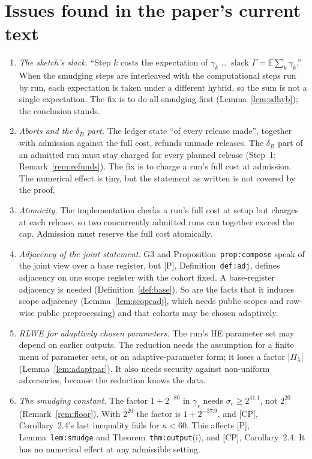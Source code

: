 \documentclass[11pt]{article}
\theoremstyle{definition}
\theoremstyle{plain}
\newcommand{\Ex}{\mathbb{E}}
\newcommand{\CP}{\textup{[CP]}}
\newcommand{\Pp}{\textup{[P]}}
\begin{document}
\section{Issues found in the paper's current text}
\label{sec:issues}

\begin{enumerate}[label=(I\arabic*)]
  \item \emph{The sketch's slack.} ``Step $k$ costs the expectation of $\gamma_k$ \dots\ slack $\Gamma=\Ex\sum_k\gamma_k$.'' When the smudging steps are interleaved with the computational steps run by run, each expectation is taken under a different hybrid, so the sum is not a single expectation. The fix is to do all smudging first (Lemma~\ref{lem:sdhyb}); the conclusion stands.
  \item \emph{Aborts and the $\delta_B$ part.} The ledger state ``of every release made'', together with admission against the full cost, refunds unmade releases. The $\delta_B$ part of an admitted run must stay charged for every planned release (Step~1; Remark~\ref{rem:refunds}). The fix is to charge a run's full cost at admission. The numerical effect is tiny, but the statement as written is not covered by the proof.
  \item \emph{Atomicity.} The implementation checks a run's full cost at setup but charges at each release, so two concurrently admitted runs can together exceed the cap. Admission must reserve the full cost atomically.
  \item \emph{Adjacency of the joint statement.} G3 and Proposition~\texttt{prop:compose} speak of the joint view over a base register, but \Pp, Definition~\texttt{def:adj}, defines adjacency on one scope register with the cohort fixed. A base-register adjacency is needed (Definition~\ref{def:base}). So are the facts that it induces scope adjacency (Lemma~\ref{lem:scopeadj}, which needs public scopes and row-wise public preprocessing) and that cohorts may be chosen adaptively.
  \item \emph{RLWE for adaptively chosen parameters.} The run's HE parameter set may depend on earlier outputs. The reduction needs the assumption for a finite menu of parameter sets, or an adaptive-parameter form; it loses a factor $|\Pi_\lambda|$ (Lemma~\ref{lem:adaptpar}). It also needs security against non-uniform adversaries, because the reduction knows the data.
  \item \emph{The smudging constant.} The factor $1+2^{-80}$ in $\gamma_s$ needs $\sigma_c\ge2^{41.1}$, not $2^{20}$ (Remark~\ref{rem:floor}). With $2^{20}$ the factor is $1+2^{-37.9}$, and \CP, Corollary~2.4's last inequality fails for $\kappa<60$. This affects \Pp, Lemma~\texttt{lem:smudge} and Theorem~\texttt{thm:output}(i), and \CP, Corollary~2.4. It has no numerical effect at any admissible setting.

\end{enumerate}
\end{document}
